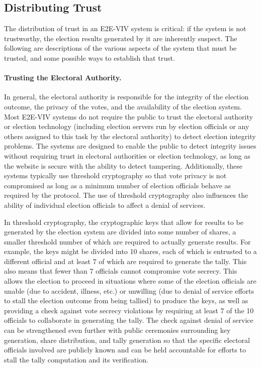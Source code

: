 \subsection{Distributing Trust}
\label{sec:trust}

The distribution of trust in an E2E-VIV system is critical: if the
system is not trustworthy, the election results generated by it are
inherently suspect. The following are descriptions of the various
aspects of the system that must be trusted, and some possible ways to
establish that trust.

\paragraph{Trusting the Electoral Authority.} 

In general, the electoral authority is responsible for the integrity
of the election outcome, the privacy of the votes, and the
availability of the election system. Most E2E-VIV systems do not
require the public to trust the electoral authority or election
technology (including election servers run by election officials or
any others assigned to this task by the electoral authority) to detect
election integrity problems. The systems are designed to enable the
public to detect integrity issues without requiring trust in electoral
authorities or election technology, as long as the website is secure
with the ability to detect tampering. Additionally, these systems
typically use threshold cryptography so that vote privacy is not
compromised as long as a minimum number of election officials behave
as required by the protocol. The use of threshold cryptography also
influences the ability of individual election officials to affect a
denial of services.

In threshold cryptography, the cryptographic keys that allow for
results to be generated by the election system are divided into some
number of shares, a smaller threshold number of which are required to
actually generate results. For example, the keys might be divided into
10 shares, each of which is entrusted to a different official and at
least 7 of which are required to generate the tally. This also means
that fewer than 7 officials cannot compromise vote secrecy. This
allows the election to proceed in situations where some of the
election officials are unable (due to accident, illness, etc.) or
unwilling (due to denial of service efforts to stall the election
outcome from being tallied) to produce the keys, as well as providing
a check against vote secrecy violations by requiring at least 7 of the
10 officials to collaborate in generating the tally. The check against
denial of service can be strengthened even further with public
ceremonies surrounding key generation, share distribution, and tally
generation so that the specific electoral officials involved are
publicly known and can be held accountable for efforts to stall the
tally computation and its verification.

